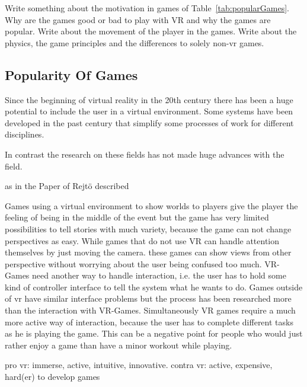 Write something about the motivation in games of Table~\ref{tab:popularGames}. Why are the games good or bad to play with VR and why the games are popular. Write about the movement of the player in the games. Write about the physics, the game principles and the differences to solely non-vr games.

\subsection{Popularity Of Games}
Since the beginning of virtual reality in the 20th century there has been a huge potential to include the user in a virtual environment. Some systems have been developed in the past century that simplify some processes of work for different disciplines. 


In contrast the research on these fields has not made huge advances with the field.

as in the Paper of Rejtö described 

Games using a virtual environment to show worlds to players give the player the feeling of being in the middle of the event but the game has very limited possibilities to tell stories with much variety, because the game can not change perspectives as easy. While games that do not use VR can handle attention themselves by just moving the camera. these games can show views from other perspective without worrying about the user being confused too much. VR-Games need another way to handle interaction, i.e. the user has to hold some kind of controller interface to tell the system what he wants to do. Games outside of vr have similar interface problems but the process has been researched more than the interaction with VR-Games. Simultaneously VR games require a much more active way of interaction, because the user has to complete different tasks as he is playing the game. This can be a negative point for people who would just rather enjoy a game than have a minor workout while playing.
			
pro vr: immerse, active, intuitive, innovative.
contra vr: active, expensive, hard(er) to develop games


